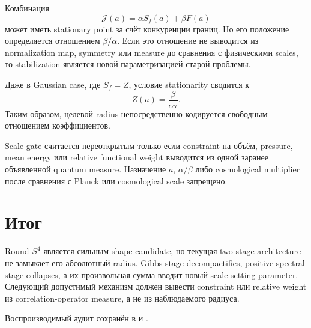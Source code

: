 Комбинация
\begin{equation}
 \mathcal J(a)=\alpha S_f(a)+\beta F(a)
\end{equation}
может иметь stationary point за счёт конкуренции границ. Но его положение
определяется отношением \(\beta/\alpha\). Если это отношение не выводится из
normalization map, symmetry или measure до сравнения с физическими scales,
то stabilization является новой параметризацией старой проблемы.

Даже в Gaussian case, где \(S_f=Z\), условие stationarity сводится к
\begin{equation}
 Z(a)=\frac{\beta}{\alpha\tau}.
\end{equation}
Таким образом, целевой radius непосредственно кодируется свободным
отношением коэффициентов.

\begin{nogocriterion}
Scale gate считается переоткрытым только если constraint на объём, pressure,
mean energy или relative functional weight выводится из одной заранее
объявленной quantum measure. Назначение \(a\), \(\alpha/\beta\) либо
cosmological multiplier после сравнения с Planck или cosmological scale
запрещено.
\end{nogocriterion}

\section{Итог}

\begin{theorem}
Round \(S^4\) является сильным shape candidate, но текущая two-stage
architecture не замыкает его абсолютный radius. Gibbs stage decompactifies,
positive spectral stage collapses, а их произвольная сумма вводит новый
scale-setting parameter. Следующий допустимый механизм должен вывести
constraint или relative weight из correlation-operator measure, а не из
наблюдаемого радиуса.
\end{theorem}

Воспроизводимый аудит сохранён в
 и
.